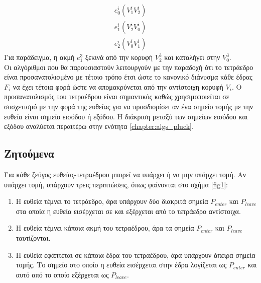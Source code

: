\begin{eqnarray*}
e^i_0 ({V^i_1 V^i_2})\\
e^i_1 ({V^i_2 V^i_0})\\	
e^i_2 ({V^i_0 V^i_1})		
\end{eqnarray*}
Για παράδειγμα, η ακμή $e^3_1$ ξεκινά από την κορυφή $V^3_2$  και καταλήγει στην $V^3_0$.\\

Οι αλγόριθμοι που θα παρουσιαστούν λειτουργούν με την παραδοχή ότι το τετράεδρο είναι προσανατολισμένο με τέτοιο τρόπο έτσι ώστε το κανονικό διάνυσμα κάθε έδρας $F_i$ να έχει τέτοια φορά  ώστε να απομακρύνεται από την αντίστοιχη κορυφή $V_i$. Ο προσανατολισμός του τετραέδρου είναι σημαντικός καθώς χρησιμοποιείται σε συσχετισμό με την φορά της ευθείας για να προσδιορίσει αν ένα σημείο τομής με την ευθεία είναι σημείο εισόδου ή εξόδου. Η διάκριση μεταξύ των σημείων εισόδου και εξόδου αναλύεται περαιτέρω στην ενότητα \ref{chapter:algs_pluck}.

\subsection{Ζητούμενα}
\label{chapter:algoutput}
\noindent Για κάθε ζεύγος ευθείας-τετραέδρου μπορεί να υπάρχει ή να μην υπάρχει τομή. Αν υπάρχει τομή, υπάρχουν τρεις περιπτώσεις, όπως φαίνονται στο σχήμα \ref{fig1}:

\begin{enumerate}
\item Η ευθεία τέμνει το τετράεδρο, άρα υπάρχουν δύο διακριτά σημεία $P_{enter}$ και $P_{leave}$ στα οποία η ευθεία εισέρχεται σε και εξέρχεται από το τετράεδρο αντίστοιχα.  

\item Η ευθεία τέμνει κάποια ακμή του τετραέδρου, άρα τα σημεία $P_{enter}$ και $P_{leave}$ ταυτίζονται.

\item Η ευθεία εφάπτεται σε κάποια έδρα του τετραέδρου, άρα υπάρχουν άπειρα σημεία τομής. Το σημείο στο οποίο η ευθεία εισέρχεται στην έδρα λογίζεται ως  $P_{enter}$ και αυτό από το οποίο εξέρχεται ως $P_{leave}$. 
\end{enumerate}
\pagebreak

